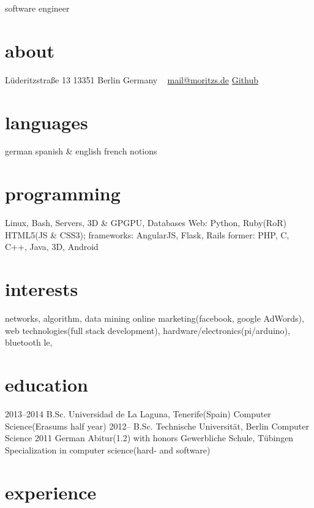 \documentclass[]{friggeri-cv}
\begin{document}
       {software engineer}


\begin{aside}
  \section{about}
    Lüderitzstraße 13
    13351 Berlin
    Germany
    ~
    \href{mailto:mail@moritz.de}{mail@moritzs.de}
    \href{https://github.com/moritzschaefer}{Github}
  \section{languages}
    german
    spanish \&  english
    french notions
  \section{programming}
    Linux, Bash, Servers, 3D \& GPGPU, Databases
    Web:
    Python, Ruby(RoR)
    HTML5(JS \& CSS3); frameworks: AngularJS, Flask, Rails
    former:
    PHP, C, C++, Java, 3D, Android
\end{aside}

\section{interests}

networks, algorithm, data mining
online marketing(facebook, google AdWords),
web technologies(full stack development),
hardware/electronics(pi/arduino), bluetooth le,

\section{education}

\begin{entrylist}
  \entry
    {2013–2014}
    {B.Sc.}
    {Universidad de La Laguna, Tenerife(Spain)}
    {Computer Science(Erasums half year)}
  \entry
    {2012–}
    {B.Sc.}
    {Technische Universität, Berlin}
    {Computer Science}
  \entry
    {2011}
    {German Abitur(1.2) with honors}
    {Gewerbliche Schule, Tübingen}
    {Specialization in computer science(hard- and software)}
\end{entrylist}

\section{experience}
\end{document}
